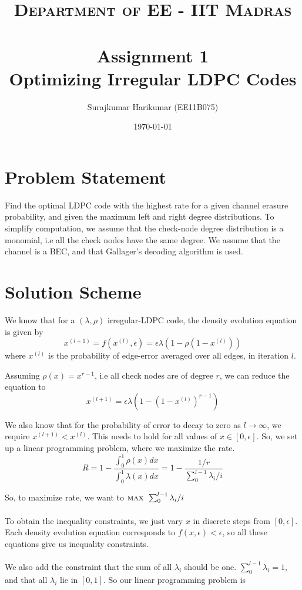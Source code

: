\documentclass[paper=a4, fontsize=12pt]{scrartcl} %
\title{	
\normalfont \normalsize 
\textsc{Department of EE - IIT Madras} \\ [25pt] %
\horrule{0.5pt} \\[0.4cm] %
\huge Assignment 1 \\Optimizing Irregular LDPC Codes %
\horrule{2pt} \\[0.5cm] %
}
\author{Surajkumar Harikumar (EE11B075)} %
\date{\normalsize\today} %
\numberwithin{equation}{section} %
\numberwithin{figure}{section} %
\numberwithin{table}{section} %
\begin{document}
\maketitle %


\section{Problem Statement}

Find the optimal LDPC code with the highest rate for a given channel erasure probability, and given the maximum left and right degree distributions. To simplify computation, we assume that the check-node degree distribution is a monomial, i.e all the check nodes have the same degree. We assume that the channel is a BEC, and that Gallager's decoding algorithm is used.

\section{Solution Scheme}
We know that for a $(\lambda,\rho)$ irregular-LDPC code, the density evolution equation is given by
\begin{equation}
 x^{(l+1)} = f(x^{(l)},\epsilon)=\epsilon \lambda( 1 - \rho(1-x^{(l)} ) ) 
\end{equation}
where $x^{(l)}$ is the probability of edge-error averaged over all edges, in iteration $l$.

Assuming $\rho(x)=x^{r-1}$, i.e all check nodes are of degree $r$, we can reduce the equation to 
\begin{equation}
 x^{(l+1)} = \epsilon \lambda\left( 1 - (1-x^{(l)} )^{r-1} \right) 
\end{equation}

We also know that for the probability of error to decay to zero as $l \to \infty$, we require $x^{(l+1)} < x^{(l)}$. This needs to hold for all values of $x \in [0,\epsilon]$. So, we set up a linear programming problem, where we maximize the rate.
\begin{equation}
R = 1 - \frac{\int_0^1 \rho(x)dx}{\int_0^1 \lambda(x)dx} = 1 - \frac{1/r}{\sum_0^{l-1} \lambda_i/i}
\end{equation}

So, to maximize rate, we want to  $\textsc{max}\:\: \sum_0^{l-1} \lambda_i/i$
\\ \\
To obtain the inequality constraints, we just vary $x$ in discrete steps from $[0,\epsilon]$. Each density evolution equation corresponds to $f(x,\epsilon)<\epsilon$, so all these equations give us inequality constraints.
\\ \\
We also add the constraint that the sum of all $\lambda_i$ should be one. $\sum_0^{l-1} \lambda_i =1$, and that all $\lambda_i$ lie in $[0,1]$. So our linear programming problem is
\end{document}

